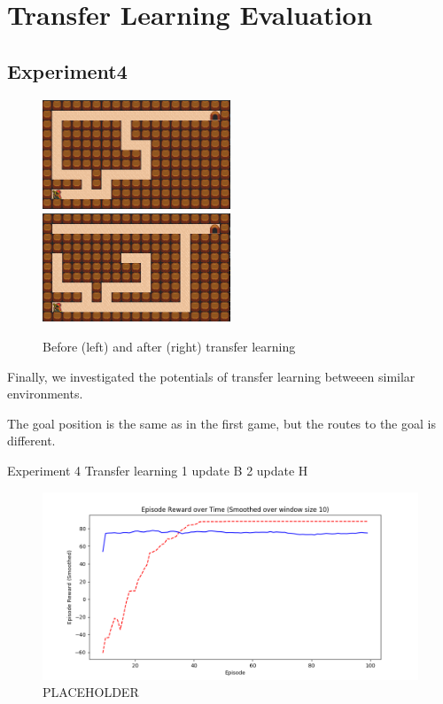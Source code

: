     
\newpage
\section{Transfer Learning Evaluation}
\label{transfer_learning}

\subsection{Experiment4}

\begin{figure}[!htb]
\centerline{
\includegraphics[width=0.5\textwidth]{./figures/experiment4_before}
\includegraphics[width=0.5\textwidth]{./figures/experiment4_after}
}
\caption{Before (left) and after (right) transfer learning}
\label{experiment4}
\end{figure}    

Finally, we investigated the potentials of transfer learning betweeen similar environments. 

The goal position is the same as in the first game, but the routes to the goal is different. 

Experiment 4 Transfer learning 
    1 update B
    2 update H


\begin{figure}[!htb]
\centering
\includegraphics[width=1.0\textwidth]{./figures/placeholder}
\caption{PLACEHOLDER}
\label{proposed_architecture}
\end{figure}


